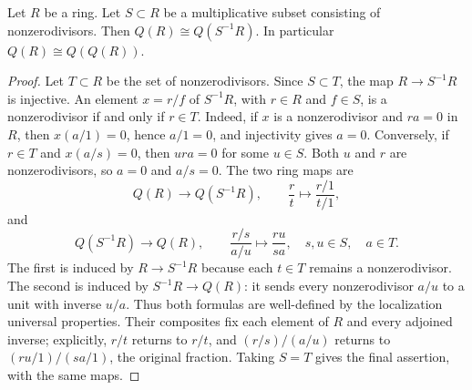 \begin{lemma}
\label{editorial-source-lemma-total-ring-fractions}
Let $R$ be a ring.
Let $S \subset R$ be a multiplicative subset consisting of nonzerodivisors.
Then $Q(R) \cong Q(S^{-1}R)$.
In particular $Q(R) \cong Q(Q(R))$.
\end{lemma}

\begin{proof}
Let $T\subset R$ be the set of nonzerodivisors.
Since $S\subset T$, the map $R\to S^{-1}R$ is injective.
An element $x=r/f$ of $S^{-1}R$, with $r\in R$ and $f\in S$,
is a nonzerodivisor if and only if $r\in T$.
Indeed, if $x$ is a nonzerodivisor and $ra=0$ in $R$, then
$x(a/1)=0$, hence $a/1=0$, and injectivity gives $a=0$.
Conversely, if $r\in T$ and $x(a/s)=0$, then
$ura=0$ for some $u\in S$. Both $u$ and $r$ are nonzerodivisors,
so $a=0$ and $a/s=0$.
The two ring maps are
$$
Q(R)\longrightarrow Q(S^{-1}R),\qquad
\frac{r}{t}\longmapsto\frac{r/1}{t/1},
$$
and
$$
Q(S^{-1}R)\longrightarrow Q(R),\qquad
\frac{r/s}{a/u}\longmapsto\frac{ru}{sa},
\quad s,u\in S,\quad a\in T.
$$
The first is induced by $R\to S^{-1}R$ because each $t\in T$
remains a nonzerodivisor. The second is induced by $S^{-1}R\to Q(R)$:
it sends every nonzerodivisor $a/u$ to a unit with inverse $u/a$.
Thus both formulas are well-defined by the localization universal
properties. Their composites fix each element of $R$ and every
adjoined inverse; explicitly, $r/t$ returns to $r/t$, and
$(r/s)/(a/u)$ returns to $(ru/1)/(sa/1)$, the original fraction.
Taking $S=T$ gives the final assertion, with the same maps.
\end{proof}